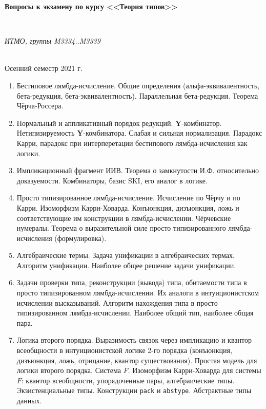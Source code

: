 \documentclass[11pt,a4paper,oneside]{article}
\begin{document}
\begin{center}
\begin{Large}{\bfseries Вопросы к экзамену по курсу <<Теория типов>>}\end{Large}\\
\vspace{1mm}
\begin{small} \itshape ИТМО, группы M3334..M3339\end{small}\\
\small Осенний семестр 2021 г.
\end{center}

\begin{enumerate}
\item Бестиповое лямбда-исчисление. Общие определения (альфа-эквивалентность, бета-редукция, бета-эквивалентность).
Параллельная бета-редукция. Теорема Чёрча-Россера.
\item Нормальный и аппликативный порядок редукций. \textbf{Y}-комбинатор.
Нетипизируемость \textbf{Y}-комбинатора. Слабая и сильная нормализация.
Парадокс Карри, парадокс при интерперетации бестипового лямбда-исчисления как логики.
\item Импликационный фрагмент ИИВ. Теорема о замкнутости И.Ф. относительно доказуемости.
Комбинаторы, базис SKI, его аналог в логике.
\item Просто типизированное лямбда-исчисление. Исчисление по Чёрчу и по Карри. Изоморфизм Карри-Ховарда.
Конъюнкция, дизъюнкция, ложь и соответствующие им конструкции в лямбда-исчислении. 
Чёрчевские нумералы. Теорема о выразительной силе просто типизированного лямбда-исчисления (формулировка).
\item Алгебраические термы. Задача унификации в алгебраических термах. Алгоритм унификации. Наиболее общее решение задачи унификации.
\item Задачи проверки типа, реконструкции (вывода) типа, обитаемости типа в просто типизированном лямбда-исчислении.
Их аналоги в интуиционистском исчислении высказываний. 
Алгоритм нахождения типа в просто типизированном лямбда-исчислении. Наиболее общий тип, наиболее общая пара.
\item Логика второго порядка. Выразимость связок через импликацию и квантор всеобщности в интуиционистской логике 
2-го порядка (конъюнкция, дизъюнкция, ложь, отрицание, квантор существования). Простая модель для логики второго порядка.
Система $F$. Изоморфизм Карри-Ховарда для системы $F$: квантор всеобщности, упорядоченные пары, алгебраические типы.
Экзистенциальные типы. Конструкции \texttt{pack} и \texttt{abstype}. Абстрактные типы данных. 

\end{enumerate}
\end{document}
